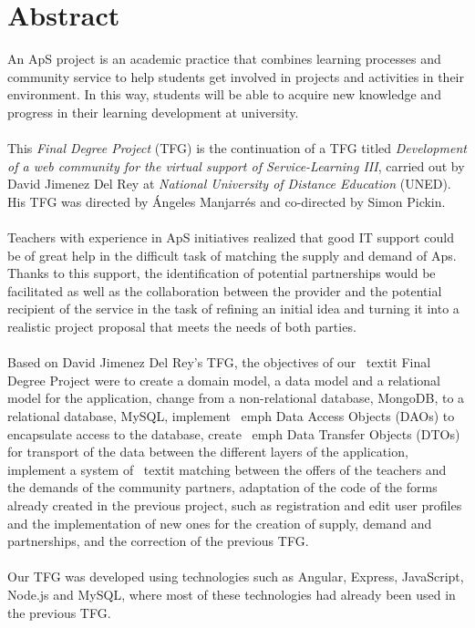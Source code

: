 \documentclass[11pt]{book}
\begin{document}
\chapter*{Abstract} 
An ApS project is an academic practice that combines learning processes and community service to help students get involved in projects and activities in their environment. In this way, students will be able to acquire new knowledge and progress in their learning development at university. \\\\
This \textit{Final Degree Project} (TFG) is the continuation of a TFG titled \textit{Development of a web community for the virtual support of Service-Learning III}, carried out by David Jimenez Del Rey at \emph{National University of Distance Education} (UNED). His TFG was directed by Ángeles Manjarrés and co-directed by Simon Pickin. \\\\
Teachers with experience in ApS initiatives realized that good IT support could be of great help in the difficult task of matching the supply and demand of Aps. Thanks to this support, the identification of potential partnerships would be facilitated as well as the collaboration between the provider and the potential recipient of the service in the task of refining an initial idea and turning it into a realistic project proposal that meets the needs of both parties. \\\\
Based on David Jimenez Del Rey's TFG, the objectives of our \ textit {Final Degree Project} were to create a domain model, a data model and a relational model for the application, change from a non-relational database, MongoDB, to a relational database, MySQL, implement \ emph {Data Access Objects} (DAOs) to encapsulate access to the database, create \ emph {Data Transfer Objects} (DTOs) for transport of the data between the different layers of the application, implement a system of \ textit {matching} between the offers of the teachers and the demands of the community partners, adaptation of the code of the forms already created in the previous project, such as registration and edit user profiles and the implementation of new ones for the creation of supply, demand and partnerships, and the correction of the previous TFG. \\\\
Our TFG was developed using technologies such as Angular, Express, JavaScript, Node.js and MySQL, where most of these technologies had already been used in the previous TFG.\\\\
\end{document}
